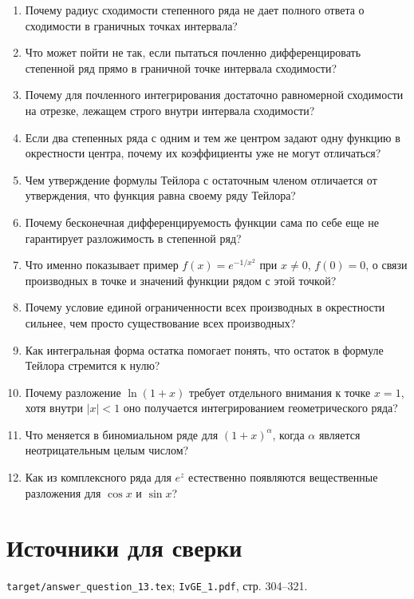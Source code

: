 \documentclass[12pt,a4paper]{article}
\begin{document}
\begin{enumerate}
\item Почему радиус сходимости степенного ряда не дает полного ответа о сходимости в граничных точках интервала?
\item Что может пойти не так, если пытаться почленно дифференцировать степенной ряд прямо в граничной точке интервала сходимости?
\item Почему для почленного интегрирования достаточно равномерной сходимости на отрезке, лежащем строго внутри интервала сходимости?
\item Если два степенных ряда с одним и тем же центром задают одну функцию в окрестности центра, почему их коэффициенты уже не могут отличаться?
\item Чем утверждение формулы Тейлора с остаточным членом отличается от утверждения, что функция равна своему ряду Тейлора?
\item Почему бесконечная дифференцируемость функции сама по себе еще не гарантирует разложимость в степенной ряд?
\item Что именно показывает пример \(f(x)=e^{-1/x^2}\) при \(x\ne0\), \(f(0)=0\), о связи производных в точке и значений функции рядом с этой точкой?
\item Почему условие единой ограниченности всех производных в окрестности сильнее, чем просто существование всех производных?
\item Как интегральная форма остатка помогает понять, что остаток в формуле Тейлора стремится к нулю?
\item Почему разложение \(\ln(1+x)\) требует отдельного внимания к точке \(x=1\), хотя внутри \(|x|<1\) оно получается интегрированием геометрического ряда?
\item Что меняется в биномиальном ряде для \((1+x)^\alpha\), когда \(\alpha\) является неотрицательным целым числом?
\item Как из комплексного ряда для \(e^z\) естественно появляются вещественные разложения для \(\cos x\) и \(\sin x\)?
\end{enumerate}

\section*{Источники для сверки}

\texttt{target/answer\_question\_13.tex};
\texttt{IvGE\_1.pdf}, стр. 304--321.
\end{document}
